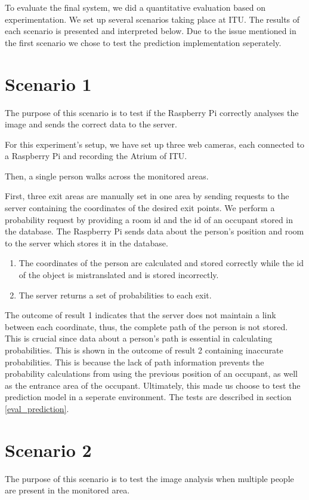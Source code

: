 To evaluate the final system, we did a quantitative evaluation based on experimentation. We set up several scenarios taking place at ITU. The results of each scenario is presented and interpreted below. Due to the issue mentioned in the first scenario we chose to test the prediction implementation seperately.

\section{Scenario 1}
\label{sec:scen1}
The purpose of this scenario is to test if the Raspberry Pi correctly analyses the image and sends the correct data to the server. 

For this experiment's setup, we have set up three web cameras, each connected to a Raspberry Pi and recording the Atrium of ITU. 

Then, a single person walks across the monitored areas.

First, three exit areas are manually set in one area by sending requests to the server containing the coordinates of the desired exit points. We perform a probability request by providing a room id and the id of an occupant stored in the database. The Raspberry Pi sends data about the person's position and room to the server which stores it in the database.

\begin{enumerate}
\item The coordinates of the person are calculated and stored correctly while the id of the object is mistranslated and is stored incorrectly. 
\item The server returns a set of probabilities to each exit. 
\end{enumerate}

The outcome of result 1 indicates that the server does not maintain a link between each coordinate, thus, the complete path of the person is not stored. This is crucial since data about a person's path is essential in calculating probabilities. This is shown in the outcome of result 2 containing inaccurate probabilities. This is because the lack of path information prevents the probability calculations from using the previous position of an occupant, as well as the entrance area of the occupant. Ultimately, this made us choose to test the prediction model in a seperate environment. The tests are described in section \ref{eval_prediction}.

\section{Scenario 2}
The purpose of this scenario is to test the image analysis when multiple people are present in the monitored area.

